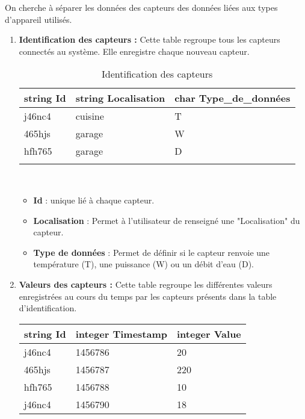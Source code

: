 \documentclass[10pt,a4paper]{article}
\begin{document}
On cherche à séparer les données des capteurs des données liées aux types d'appareil utilisés.
\begin{enumerate}
\item \textbf{Identification des capteurs :} Cette table regroupe tous les capteurs connectés au système. Elle enregistre chaque nouveau capteur.
\begin{table}[h!]
    \centering
    \begin{tabular}{|l|l|l|}
    \hline
    \rowcolor[HTML]{EFEFEF} 
    string Id & string Localisation & char Type\_de\_données \\ \hline
    j46nc4    & cuisine             & T                      \\ \hline
    465hjs    & garage              & W                      \\ \hline
    hfh765    & garage              & D                      \\ \hline
              &                     &                       
    \end{tabular}
    \caption{Identification des capteurs}
\end{table}
\\
\begin{itemize}
\item \textbf{Id} : unique lié à chaque capteur.
\item \textbf{Localisation} : Permet à l'utilisateur de renseigné une "Localisation" du capteur.
\item \textbf{Type de données} : Permet de définir si le capteur renvoie une température (T), une puissance (W) ou un débit d'eau (D).
\end{itemize}
\newpage
\item \textbf{Valeurs des capteurs :} Cette table regroupe les différentes valeurs enregistrées au cours du temps par les capteurs présents dans la table d'identification.
\begin{table}[h!]
\centering
    \begin{tabular}{|l|l|l|}
    \hline
    \rowcolor[HTML]{EFEFEF} 
    string Id & integer Timestamp & integer Value \\ \hline
    j46nc4    & 1456786           & 20            \\ \hline
    465hjs    & 1456787           & 220           \\ \hline
    hfh765    & 1456788           & 10            \\ \hline
    j46nc4    & 1456790           & 18            \\ \hline

\end{tabular}
\end{table}
\end{enumerate}
\end{document}
